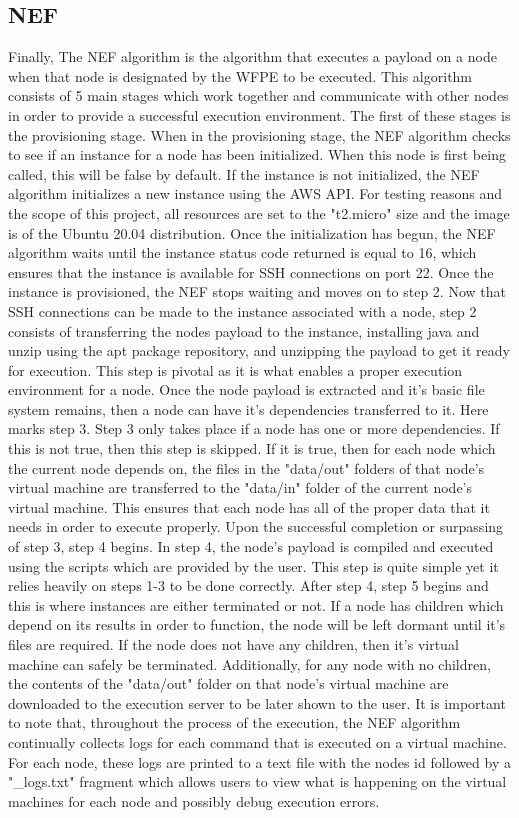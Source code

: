 \documentclass[fleqn,10pt]{SelfArx} %
\begin{document}
\subsection{NEF}

Finally, The NEF algorithm is the algorithm that executes a payload on a node when that node is designated by the WFPE to be executed. This algorithm consists of 5 main stages which work together and communicate with other nodes in order to provide a successful execution environment. The first of these stages is the provisioning stage. When in the provisioning stage, the NEF algorithm checks to see if an instance for a node has been initialized. When this node is first being called, this will be false by default. If the instance is not initialized, the NEF algorithm initializes a new instance using the AWS API. For testing reasons and the scope of this project, all resources are set to the "t2.micro" size and the image is of the Ubuntu 20.04 distribution. Once the initialization has begun, the NEF algorithm waits until the instance status code returned is equal to 16, which ensures that the instance is available for SSH connections on port 22. Once the instance is provisioned, the NEF stops waiting and moves on to step 2. Now that SSH connections can be made to the instance associated with a node, step 2 consists of transferring the nodes payload to the instance, installing java and unzip using the apt package repository, and unzipping the payload to get it ready for execution. This step is pivotal as it is what enables a proper execution environment for a node. Once the node payload is extracted and it's basic file system remains, then a node can have it's dependencies transferred to it. Here marks step 3. Step 3 only takes place if a node has one or more dependencies. If this is not true, then this step is skipped. If it is true, then for each node which the current node depends on, the files in the "data/out" folders of that node's virtual machine are transferred to the "data/in" folder of the current node's virtual machine. This ensures that each node has all of the proper data that it needs in order to execute properly. Upon the successful completion or surpassing of step 3, step 4 begins. In step 4, the node's payload is compiled and executed using the scripts which are provided by the user. This step is quite simple yet it relies heavily on steps 1-3 to be done correctly. After step 4, step 5 begins and this is where instances are either terminated or not. If a node has children which depend on its results in order to function, the node will be left dormant until it's files are required. If the node does not have any children, then it's virtual machine can safely be terminated. Additionally, for any node with no children, the contents of the "data/out" folder on that node's virtual machine are downloaded to the execution server to be later shown to the user. It is important to note that, throughout the process of the execution, the NEF algorithm continually collects logs for each command that is executed on a virtual machine. For each node, these logs are printed to a text file with the nodes id followed by a "\_logs.txt" fragment which allows users to view what is happening on the virtual machines for each node and possibly debug execution errors.
\end{document}
